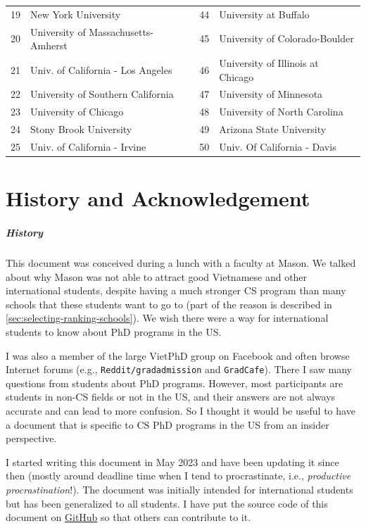 \documentclass[oneside,11pt,dvipsnames]{book}
\newcommand{\red}[1]{{\color{red}{#1}}}
\begin{document}
\begin{table}[h]
\begin{tabular}{rl|rl}
    19 & New York University  & 44&  University at Buffalo\red{$^*$}\\
    20 &  University of Massachusetts-Amherst\red{$^*$} &45& University of Colorado-Boulder \\
    21 & Univ. of California - Los Angeles &46& University of Illinois at Chicago  \\
    22 & University of Southern California &47& University of Minnesota \\
    23 & University of Chicago &48& University of North Carolina\red{$^*$} \\
    24 & Stony Brook University\red{$^*$} &49& Arizona State University\red{$^*$} \\
    25 &  Univ. of California - Irvine&50& Univ. Of California - Davis \\
    \bottomrule
  \end{tabular}
\end{table}

\chapter{History and Acknowledgement}\label{sec:ack}
\paragraph{History} This document was conceived during a lunch with a faculty at Mason.  We talked about why Mason was not able to attract good Vietnamese and other international students, despite having a much stronger CS program than many schools that these students want to go to (part of the reason is described in \autoref{sec:selecting-ranking-schools}). We wish there were a way for international students to know about PhD programs in the US.

I was also a member of the large VietPhD group on Facebook and often browse Internet forums (e.g., \texttt{Reddit/gradadmission} and \texttt{GradCafe}). There I saw many questions from students about PhD programs.  However, most participants are students in non-CS fields or not in the US, and their answers are not always accurate and can lead to more confusion. So I thought it would be useful to have a document that is specific to CS PhD programs in the US from an insider perspective.

I started writing this document in May 2023 and have been updating it since then (mostly around deadline time when I tend to procrastinate, i.e., \emph{productive procrastination}!). The document was initially intended for international students but has been generalized to all students.
I have put the source code of this document on \href{https://github.com/nguyenthanhvuh/phd-cs-us}{GitHub} so that others can contribute to it.
\end{document}
